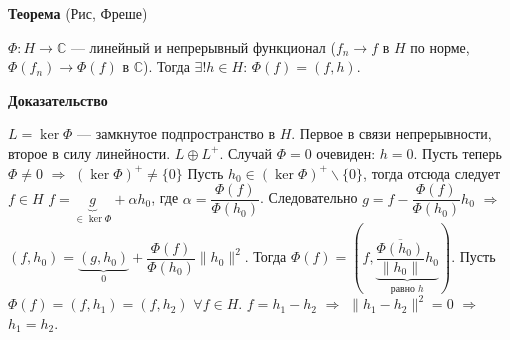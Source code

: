 \documentclass[12pt]{article}
\begin{document}
\textbf{Теорема} (Рис, Фреше)

$\Phi:H \to \mathbb C$ --- линейный и непрерывный функционал ($f_n \to f$ в $H$ по норме, $\Phi(f_n) \to \Phi(f)$ в $\mathbb C$).
Тогда $\exists! h \in H$: $\Phi(f) = (f,h)$.

\textbf{Доказательство}

$L = \ker \Phi$ --- замкнутое подпространство в $H$.
Первое в связи непрерывности, второе в силу линейности.
$L \oplus L^+$.
Случай $\Phi = 0$ очевиден: $h = 0$.
Пусть теперь $\Phi \ne 0$ $\Rightarrow$ $(\ker\Phi)^+ \ne \{0\}$
Пусть $h_0 \in (\ker\Phi)^+\backslash\{0\}$, тогда отсюда следует $f \in H$ $f = \underbrace{g}_{\in \ker \Phi}+\alpha h_0$,
где $\alpha = \dfrac{\Phi(f)}{\Phi(h_0)}$.
Следовательно $g = f - \dfrac{\Phi(f)}{\Phi(h_0)}h_0$ $\Rightarrow$ $(f,h_0) = \underbrace{(g, h_0)}_{0} + \dfrac{\Phi(f)}{\Phi(h_0)}\|h_0\|^2$.
Тогда $\Phi(f) = (f, \underbrace{\dfrac{\overline{\Phi(h_0)}}{\|h_0\|}h_0}_{\text{равно }h})$.
Пусть $\Phi(f) = (f, h_1) = (f, h_2)$ $\forall f\in H$.
$f = h_1 - h_2$ $\Rightarrow$ $\|h_1 - h_2\|^2 = 0$ $\Rightarrow$ $h_1 = h_2$.
\end{document}
